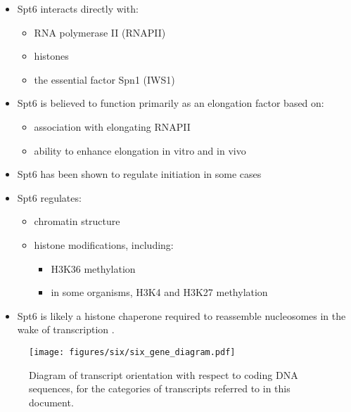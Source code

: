 \begin{itemize}[nosep, topsep=.5em]
\item Spt6 interacts directly with:
	\begin{itemize}[nosep]
	\item RNA polymerase II (RNAPII) \citep{close2011, diebold2011, liu2011, sdano2017, sun2010, yoh2007}
	\item histones \citep{bortvin1996, mccullough2015}
	\item the essential factor Spn1 (IWS1) \citep{diebold2010b, li2018, mcdonald2010}
	\end{itemize}
\item Spt6 is believed to function primarily as an elongation factor based on:
	\begin{itemize}[nosep]
	\item association with elongating RNAPII \citep{andrulis2000, ivanovska2011, kaplan2000, mayer2010}
	\item ability to enhance elongation in vitro \citep{endoh2004} and in vivo \citep{ardehali2009}
	\end{itemize}
\item Spt6 has been shown to regulate initiation in some cases \citep{adkins2006, ivanovska2011}
\item Spt6 regulates:
	\begin{itemize}[nosep]
	\item chromatin structure \citep{bortvin1996, degennaro2013, ivanovska2011, jeronimo2015, kaplan2003, perales2013, vanbakel2013}
	\item histone modifications, including:
		\begin{itemize}[nosep]
		\item H3K36 methylation \citep{carrozza2005, chu2006, yoh2008, youdell2008}
		\item in some organisms, H3K4 and H3K27 methylation \citep{begum2012, chen2012, degennaro2013, wang2017, wang2013}
		\end{itemize}
	\end{itemize}
\item Spt6 is likely a histone chaperone required to reassemble nucleosomes in the wake of transcription \citep{duina2011}.
\end{itemize}

\begin{wrapfigure}[7]{r}{2.75in}
\centering
\texttt{[image: figures/six/six\_gene\_diagram.pdf]}
\caption[Diagram of transcript classes.]{Diagram of transcript orientation with respect to coding DNA sequences, for the categories of transcripts referred to in this document.}
\label{fig:six_gene_diagram}
\end{wrapfigure}


